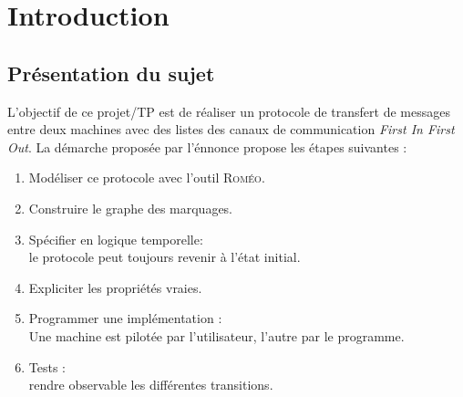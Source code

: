 \chapter{Introduction}\label{chap:Intro}
\section{Présentation du sujet}
L'objectif de ce projet/TP est de réaliser un protocole de transfert de messages entre deux machines avec des listes des canaux de communication \textit{First In First Out}. La démarche proposée par l'énnonce propose les  étapes  suivantes :
  
  
  \begin{enumerate}
  \item 
    Modéliser ce protocole avec l'outil \textsc{Roméo}.
  \item
    Construire le graphe des marquages.
  \item
    Spécifier en logique temporelle: \hfill \\
    le protocole peut toujours revenir à l’état initial.
  \item 
    Expliciter les propriétés vraies.
  \item
    Programmer une implémentation : \hfill \\
    Une machine est pilotée par l'utilisateur, l'autre par le programme.
  \item
    Tests  :\hfill \\
    rendre observable les différentes transitions.
  \end{enumerate}


